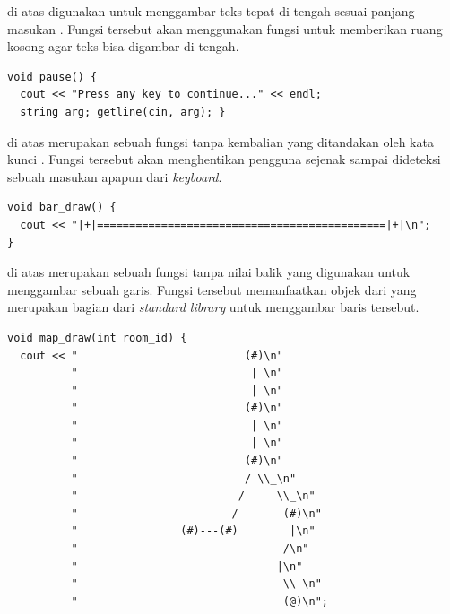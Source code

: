 \documentclass[../main.tex]{subfiles}
\begin{document}
{\Script} di atas digunakan untuk menggambar teks tepat di tengah sesuai panjang masukan . Fungsi tersebut akan menggunakan fungsi  untuk memberikan ruang kosong agar teks bisa digambar di tengah.

\begin{code}
\begin{verbatim}
void pause() {
  cout << "Press any key to continue..." << endl;
  string arg; getline(cin, arg); }
\end{verbatim}
\end{code}

{\Script} di atas merupakan sebuah fungsi tanpa kembalian yang ditandakan oleh kata kunci . Fungsi tersebut akan menghentikan pengguna sejenak sampai dideteksi sebuah masukan apapun dari \textit{keyboard}.

\begin{code}
\begin{verbatim}
void bar_draw() {
  cout << "|+|=============================================|+|\n";
}
\end{verbatim}
\end{code}

{\Script} di atas merupakan sebuah fungsi tanpa nilai balik yang digunakan untuk menggambar sebuah garis. Fungsi tersebut memanfaatkan objek  dari {\header} {\file} yang merupakan bagian dari \textit{standard library} untuk menggambar baris tersebut.

\begin{code}
\begin{verbatim}
void map_draw(int room_id) {
  cout << "                          (#)\n"
          "                           | \n"
          "                           | \n"
          "                          (#)\n"
          "                           | \n"
          "                           | \n"
          "                          (#)\n"
          "                          / \\_\n"
          "                         /     \\_\n"
          "                        /       (#)\n"
          "                (#)---(#)        |\n"
          "                                /\n"
          "                               |\n"
          "                                \\ \n"
          "                                (@)\n";
\end{verbatim}
\end{code}
\end{document}
